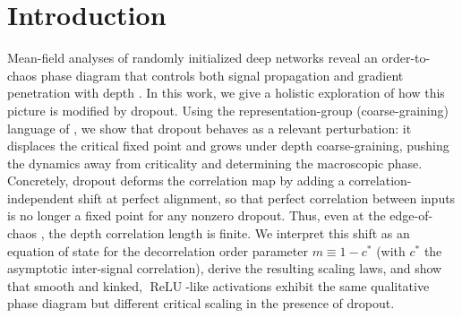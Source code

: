 \documentclass{article}
\DeclareMathOperator{\ReLU}{ReLU}
\newcommand{\relu}{\ensuremath{\ReLU}}
\theoremstyle{plain}
\theoremstyle{definition}
\theoremstyle{remark}
\begin{document}
\begin{abstract}
We develop a mean-field theory of dropout as a perturbation of critical signal propagation at the edge of chaos. Dropout shifts the perfect-alignment fixed point, making the depth scale for information propagation finite even at critical initialization. We derive critical and crossover scaling laws for correlation decay and establish that smooth activations and kinked, \relu{}-like activations constitute distinct universality classes, with different critical exponents and a universal two-parameter scaling collapse in detuning and dropout strength. The distinction traces to the analytic structure of the correlation map: smooth activations admit a Taylor expansion near perfect alignment, while kinked activations develop a branch point with universal non-analyticity. As a corollary, the framework yields saturated dropout profiles under fixed budget; a rank-flow tie-breaker then selects front-loaded schedules, substantially reducing held-out test loss at no extra computational cost, with accuracy gains as a consistent secondary effect. We test the predictions in MLPs and Vision Transformers and discuss CNN/ResNet extensions.
\end{abstract}










\section{Introduction}

Mean-field analyses of randomly initialized deep networks reveal an order-to-chaos phase diagram that controls both signal propagation and gradient penetration with depth \cite{poole2016exponentialexpressivitydeepneural,schoenholz2017deepinformationpropagation,Bahri2020StatMechDeepLearning,bahri2024leshoucheslecturesdeep}. In this work, we give a holistic exploration of how this picture is modified by dropout. Using the representation-group (coarse-graining) language of \cite{roberts2022principlesdeeplearningtheory,bahri2024leshoucheslecturesdeep}, we show that dropout behaves as a relevant perturbation: it displaces the critical fixed point and grows under depth coarse-graining, pushing the dynamics away from criticality and determining the macroscopic phase. Concretely, dropout deforms the correlation map \cite{schoenholz2017deepinformationpropagation} by adding a correlation-independent shift at perfect alignment, so that perfect correlation between inputs is no longer a fixed point for any nonzero dropout. Thus, even at the edge-of-chaos \cite{sompolinsky1988chaos,packard1988adaptation,bertschinger2004real}, the depth correlation length is finite. We interpret this shift as an equation of state for the decorrelation order parameter $m \equiv 1-c^\ast$ (with $c^\ast$ the asymptotic inter-signal correlation), derive the resulting scaling laws, and show that smooth and kinked, \relu{}-like activations exhibit the same qualitative phase diagram but different critical scaling in the presence of dropout.
\end{document}
